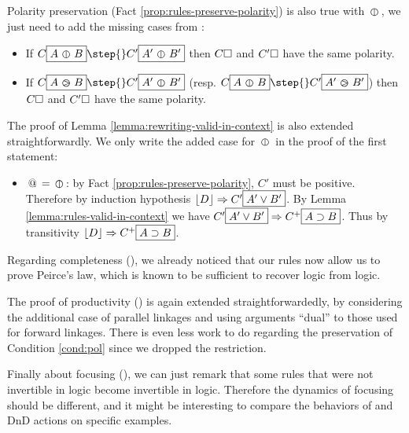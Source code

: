 Polarity preservation (Fact \ref{prop:rules-preserve-polarity}) is also true
with $\operatorname{\,\varobar\,}$, we just need to add the missing cases from :
\begin{itemize}
  \item If $C\select{A \para B} \step{} C'\select{A' \para B'}$ then $C\square$ and
  $C'\square$ have the same polarity.
  \item If $C\select{A \back B} \step{} C'\select{A' \para B'}$ (resp. $C\select{A
  \para B} \step{} C'\select{A' \back B'}$) then $C\square$ and $C'\square$ have the
  same polarity.
\end{itemize}
The proof of Lemma \ref{lemma:rewriting-valid-in-context} is also extended
straightforwardly. We only write the added case for $\operatorname{\,\varobar\,}$ in the proof of the
first statement:
\begin{itemize}
  \item $\operatorname{\,@\,} = \operatorname{\,\varobar\,}$: by Fact \ref{prop:rules-preserve-polarity}, $C'$ must
  be positive. Therefore by induction hypothesis $\lfloor D\rfloor \Rightarrow C'\fbox{$A'
  \lor B'$}$. By Lemma \ref{lemma:rules-valid-in-context} we have
  $C'\fbox{$A' \lor B'$} \Rightarrow C^+\fbox{$A \supset B$}$. Thus by transitivity
  $\lfloor D\rfloor \Rightarrow C^+\fbox{$A \supset B$}$.
\end{itemize}

Regarding completeness (), we already noticed that our
rules now allow us to prove Peirce's law, which is known to be sufficient to
recover  logic from  logic.

The proof of productivity () is again extended
straightforwardedly, by considering the additional case of parallel linkages and
using arguments ``dual'' to those used for forward linkages. There is even less
work to do regarding the preservation of Condition \ref{cond:pol} since we
dropped the  restriction.

Finally about focusing (), we can just remark that some rules
that were not invertible in  logic become invertible in 
logic. Therefore the dynamics of focusing should be different, and it might be
interesting to compare the behaviors of  and  DnD actions
on specific examples.